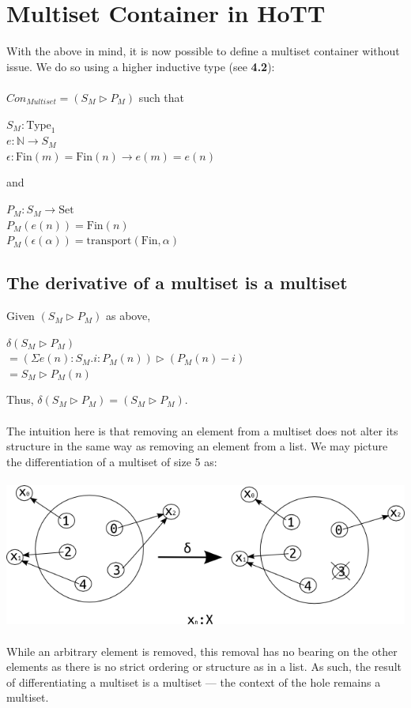 \documentclass[12pt]{report}
\begin{document}
\section{Multiset Container in HoTT}
With the above in mind, it is now possible to define a multiset container without issue. We do so using a higher inductive type\cite{lyon} (see \textbf{4.2}):\\
\\
$Con_{Multiset} = (S_M \rhd P_M)$ such that 
\begin{center}
$S_M : \text{Type}_1$\\
$e : \mathbb{N} \to S_M$\\
$\epsilon : \text{Fin}(m) = \text{Fin}(n) \to e(m) = e(n) $\\
\end{center}
and
\begin{center}
$P_M : S_M \to \text{Set}$\\
$P_M(e(n)) = \text{Fin}(n)$\\
$P_M(\epsilon(\alpha)) = \text{transport}(\text{Fin}, \alpha)$\\

\end{center}
\subsection{The derivative of a multiset is a multiset}
Given $(S_M \rhd P_M)$ as above,
\begin{center}
$\delta (S_M \rhd P_M)$\\
$= (\Sigma e(n) : S_M . i : P_M (n)) \rhd (P_M (n) -i)$\\
$= S_M \rhd P_M (n)$
\end{center}
Thus, $\delta (S_M \rhd P_M) = (S_M \rhd P_M)$.\\
\\
The intuition here is that removing an element from a multiset does not alter its  structure in the same way as removing an element from a list. We may picture the differentiation of a multiset of size 5 as:\\
\\

\includegraphics[scale=0.8]{7.png}
\\
\\
While an arbitrary element is removed, this removal has no bearing on the other elements as there is no strict ordering or structure as in a list. As such, the result of differentiating a multiset is a multiset --- the context of the hole remains a multiset.
\end{document}
